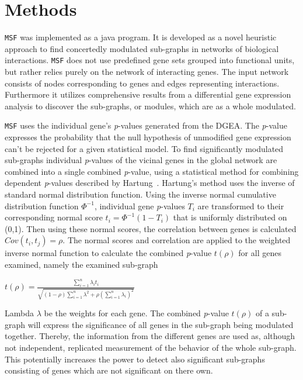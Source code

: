 \documentclass[10pt,a4paper,twocolumn]{article}
\begin{document}
	
	
	
	\section*{Methods}
	
	\texttt{MSF} was implemented as a java program. It is developed as a novel heuristic approach to find concertedly
	modulated sub-graphs in networks of biological interactions.  \texttt{MSF}
	does not use predefined gene sets grouped into functional units, but rather
	relies purely on the network of interacting genes. The input network
	consists of nodes corresponding to genes and edges representing
	interactions. Furthermore it utilizes comprehensive results from a
	differential gene expression analysis to discover the sub-graphs, or
	modules, which are as a whole modulated.
	
	\texttt{MSF} uses the individual gene's \textit{p}-values generated from
	the DGEA. The \textit{p}-value expresses the probability that the null
	hypothesis of unmodified gene expression can't be rejected for a given
	statistical model. To find significantly modulated sub-graphs individual
	\textit{p}-values of the vicinal genes in the global network are combined
	into a single combined \textit{p}-value, using a statistical method for
	combining dependent \textit{p}-values described by
	Hartung~\cite{Hartung}. Hartung's method uses the inverse of standard
	normal distribution function. Using the inverse normal cumulative distribution function $\Phi^{-1}$, individual gene \textit{p}-values $T_{i}$ are 
	transformed to their corresponding normal score $t_{i}=\Phi^{-1}(1-T_{i})$ that is uniformly distributed on (0,1). Then using these normal
	scores, the correlation between genes is calculated $Cov(t_{i},t_{j})=\rho$. The normal scores and
	correlation are applied to the weighted inverse normal function to calculate the
	combined \textit{p}-value $t(\rho)$ for all genes examined, namely the examined
	sub-graph
	\newline
	\begin{center}
		$t(\rho)=\frac{\sum_{i=1}^{n}\lambda_i t_{i} }{\sqrt{(1-\rho) \sum_{i=1}^{n} \lambda^{2}+\rho(\sum_{i=1}^{n} \lambda_i)^{2}}}$
	\end{center}
	
	Lambda $\lambda$ be the weights for each gene. The combined \textit{p}-value  $t(\rho)$ of a sub-graph will express the
	significance of all genes in the sub-graph being modulated
	together. Thereby, the information from the different genes are used as,
	although not independent, replicated measurement of the behavior of the
	whole sub-graph. This potentially increases the power to detect also
	significant sub-graphs consisting of genes which are not significant on
	there own.
	\newline
	
\end{document}
